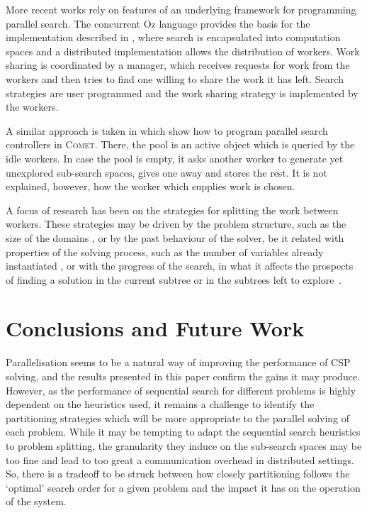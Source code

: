 \documentclass{llncs}
\begin{document}
More recent works rely on features of an underlying framework for
programming parallel search. The concurrent Oz language provides the
basis for the implementation described in \cite{par-simple:trics00},
where search is encapsulated into computation spaces and a distributed
implementation allows the distribution of workers. Work sharing is
coordinated by a manager, which receives requests for work from the
workers and then tries to find one willing to share the work it has
left. Search strategies are user programmed and the work sharing
strategy is implemented by the workers.

A similar approach is taken in \cite{hent07:parallel-CSP,hent08:parallel-CSP} which show how to program parallel search
controllers in \textsc{Comet}. There, the pool is an active object
which is queried by the idle workers. In case the pool is empty, it
asks another worker to generate yet unexplored sub-search spaces,
gives one away and stores the rest. It is not explained, however, how
the worker which supplies work is chosen.

A focus of research has been on the strategies for splitting the work
between workers. These strategies may be driven by the problem
structure, such as the size of the domains \cite{pas-silaghi01}, or by
the past behaviour of the solver, be it related with properties of the
solving process, such as the number of variables already instantiated
\cite{load-bal:rolf}, or with the progress of the search, in what it
affects the prospects of finding a solution in the current subtree
\cite{concdb-ai06}
or in the subtrees left to explore~\cite{confid:cp09}.


\section{Conclusions and Future Work}
\label{sec:conclusion}

Parallelisation seems to be a natural way of improving the performance
of CSP solving, and the results presented in this paper confirm the
gains it may produce. However, as the performance of sequential search
for different problems is highly dependent on the heuristics used, it
remains a challenge to identify the partitioning strategies which will
be more appropriate to the parallel solving of each problem. While it
may be tempting to adapt the sequential search heuristics to problem
splitting, the granularity they induce on the sub-search spaces may be
too fine and lead to too great a communication overhead in distributed
settings. So, there is a tradeoff to be struck between how closely
partitioning follows the `optimal' search order for a given problem
and the impact it has on the operation of the system.
\end{document}

